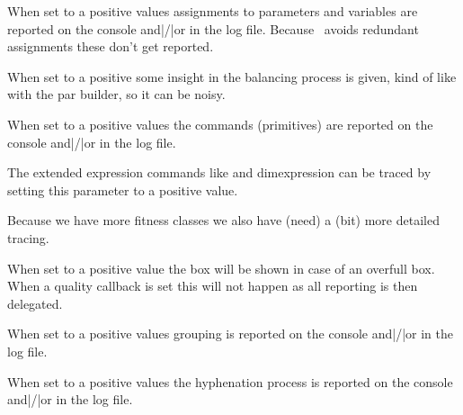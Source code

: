 \startoldprimitive[title={\prm {tracingassigns}}]

When set to a positive values assignments to parameters and variables are
reported on the console and|/|or in the log file. Because \LUAMETATEX\ avoids
redundant assignments these don't get reported.

\stopoldprimitive

\startnewprimitive[title={\prm {tracingbalancing}}]

When set to a positive some insight in the balancing process is given, kind of
like with the par builder, so it can be noisy.

\stopnewprimitive

\startoldprimitive[title={\prm {tracingcommands}}]

When set to a positive values the commands (primitives) are reported on the console
and|/|or in the log file.

\stopoldprimitive

\startnewprimitive[title={\prm {tracingexpressions}}]

The extended expression commands like  and \prm
{dimexpression} can be traced by setting this parameter to a positive value.

\stopnewprimitive

\startnewprimitive[title={\prm {tracingfitness}}]

Because we have more fitness classes we also have (need) a (bit) more detailed
tracing.

\stopnewprimitive

\startnewprimitive[title={\prm {tracingfullboxes}}]

When set to a positive value the box will be shown in case of an overfull box.
When a quality callback is set this will not happen as all reporting is then
delegated.

\stopnewprimitive

\startoldprimitive[title={\prm {tracinggroups}}]

When set to a positive values grouping is reported on the console and|/|or in the
log file.

\stopoldprimitive

\startnewprimitive[title={\prm {tracinghyphenation}}]

When set to a positive values the hyphenation process is reported on the console
and|/|or in the log file.

\stopnewprimitive

\startoldprimitive[title={\prm {tracingifs}}]

